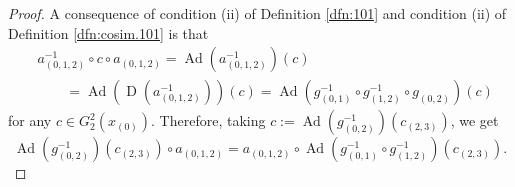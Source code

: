 \documentclass[a4paper,10pt]{amsart}
\theoremstyle{definition}
\numberwithin{equation}{section}
\newcommand{\opn}{\operatorname}
\begin{document}
\begin{proof}
A consequence of condition (ii) of Definition \ref{dfn:101} and 
condition (ii) of Definition \ref{dfn:cosim.101} is that 
\[ \begin{aligned}
& a_{(0, 1, 2)}^{-1} \circ c \circ a_{(0, 1, 2)} =
\opn{Ad}(a_{(0, 1, 2)}^{-1})(c) 
\\
& \qquad = \opn{Ad}(\opn{D}(a_{(0, 1, 2)}^{-1}))(c) = 
\opn{Ad}(g_{(0, 1)}^{-1} \circ g_{(1, 2)}^{-1} \circ g_{(0, 2)})(c)
\end{aligned} \]
for any $c \in G^2_2(x_{(0)})$. 
Therefore, taking 
$c := \opn{Ad}(g_{(0, 2)}^{-1})(c_{(2, 3)})$, we get
\begin{equation} \label{eqn:103}
\opn{Ad}(g_{(0, 2)}^{-1})(c_{(2, 3)}) \circ a_{(0, 1, 2)}
 = a_{(0, 1, 2)} \circ 
\opn{Ad}(g_{(0, 1)}^{-1} \circ g_{(1, 2)}^{-1})(c_{(2, 3)}) .
\end{equation}


\end{proof}
\end{document}
